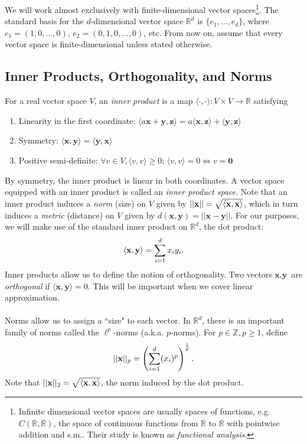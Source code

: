 \documentclass{article}
\newcommand{\R}{\mathbb{R}}
\newcommand{\Z}{\mathbb{Z}}
\newcommand{\la}{\langle}
\newcommand{\ra}{\rangle}
\newcommand{\tit}{\textit}
\newcommand{\tbf}{\textbf}
\begin{document}
We will work almost exclusively with finite-dimensional vector spaces\footnote{Infinite dimensional vector spaces are usually spaces of functions, e.g. $C(\R, \R)$, the space of continuous functions from $\R$ to $\R$ with pointwise addition and s.m.. Their study is known as \tit{functional analysis}.}. The standard basis for the $d$-dimensional vector space $\R^d$ is $\{e_1, ... , e_d\}$, where $e_1 = (1,0,...,0)$, $e_2 = (0,1,0,...,0)$, etc.  From now on, assume that every vector space is finite-dimensional unless stated otherwise.

\subsection{Inner Products, Orthogonality, and Norms}
For a real vector space $V$, an \tit{inner product} is a map $\la \cdot, \cdot \ra: V \times V \to \mathbb{R}$ satisfying 
\begin{enumerate}[label = (\alph*)]
\item Linearity in the first coordinate: $\la a\tbf{x} + \tbf{y}, \tbf{z} \ra = a\la \tbf{x},\tbf{z}\ra + \la \tbf{y}, \tbf{z} \ra$
\item Symmetry: $\la \tbf{x},\tbf{y}\ra = \la \tbf{y},\tbf{x}\ra$
\item Positive semi-definite: $\forall v \in V, \la v, v \ra \geq 0$; $\la v, v \ra = 0 \iff v = \mathbf{0}$
\end{enumerate}
By symmetry, the inner product is linear in both coordinates. A vector space equipped with an inner product is called an \tit{inner product space}. Note that an inner product induces a \tit{norm} (size) on $V$ given by $||\tbf{x}|| = \sqrt{\langle \bold{x},  \bold{x}\rangle}$, which in turn induces a \tit{metric} (distance) on $V$ given by $d(\tbf{x},\tbf{y}) = ||\tbf{x} - \tbf{y}||$. For our purposes, we will make use of the standard inner product on $\mathbb{R}^d$, the dot product: 
$$ \langle \bold{x},  \bold{y}\rangle = \sum_{i=1}^d x_iy_i.$$ 
Inner products allow us to define the notion of orthogonality. Two vectors $\tbf{x}, \tbf{y}$ are \tit{orthogonal} if $\la \tbf{x}, \tbf{y} \ra = 0$. This will be important when we cover linear approximation.
\\ \\
Norms allow us to assign a ``size" to each vector. In $\R^d$, there is an important family of norms called the $\ell^p$-norms (a.k.a. $p$-norms). For $p \in \Z, p \geq 1$, define 
$$||\bold{x}||_p = \left(\sum_{i = 1}^d (x_i)^p\right)^\frac{1}{p}.$$
Note that $||\bold{x}||_2 = \sqrt{\langle \bold{x},  \bold{x}\rangle}$, the norm induced by the dot product.
\end{document}
